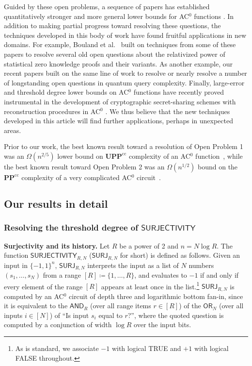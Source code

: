 \documentclass[11pt]{article}
\numberwithin{equation}{section}
\theoremstyle{definition}
\theoremstyle{plain}
\newcommand{\SURJ}{\mathsf{ SURJ}}
\newcommand{\OR}{\mathsf{ OR}}
\newcommand{\bits}{\{-1,1\}}
\newcommand{\PP}{\mathbf{PP}}
\newcommand{\UPP}{\mathbf{UPP}}
\newcommand{\AND}{\mathsf{AND}}
\begin{document}
Guided by these open problems, a sequence
of %
papers  %
has established quantitatively stronger and more general lower bounds for AC$^0$ functions \cite{bt13, bt14, sherstov14, sherstov15, dlweight, bt16, adegsurj}.
In addition to making partial progress toward resolving these questions, the techniques developed in %
this body of work  %
have found fruitful applications in new domains.
For example, Bouland et al.~\cite{bchtv} built on techniques from
%
some of these papers  %
\cite{bt13, bt14, sherstov14, bt16} to resolve several 
old open questions about the relativized power of statistical zero knowledge proofs and their variants.
%
As another example, our recent 
%
papers
\cite{adegsurj, bkt} built on the same line of work to
resolve or nearly resolve a number of longstanding open questions in quantum query complexity.
Finally, large-error and threshold degree lower bounds on AC$^0$ functions
have recently proved instrumental in the development of cryptographic secret-sharing
schemes with reconstruction procedures in AC$^0$ \cite{viola, bogicalp, cheng2017near}. We thus believe that the new techniques developed in this
%
article  %
will find %
further applications, perhaps in unexpected areas.


Prior to our work, the best known result toward a resolution of Open Problem 1 was an $\Omega(n^{2/5})$ lower
bound on $\UPP^{\text{cc}}$ complexity of an AC$^0$ function~\cite{bt16}, while 
the best known result toward Open Problem 2
was an $\Omega(n^{1/2})$ 
bound on the $\PP^{\text{cc}}$ complexity of a very complicated AC$^0$ circuit~\cite{sherstov15}. \label{sec:previoussec}

\label{s:openquestion1}

\subsection{Our results in detail}


\subsubsection{Resolving the threshold degree of
  \texorpdfstring{$\mathsf{SURJECTIVITY}$}{SURJECTIVITY}}
\label{surjoverview}
\noindent \textbf{Surjectivity and its history.} Let $R$ be a power of 2 and $n=N \log R$. The function $\mathsf{SURJECTIVITY}_{R, N}$ %
($\SURJ_{R, N}$ for short) is defined as follows. Given an input in $\bits^n$, $\SURJ_{R, N}$ interprets the input as a list of $N$ numbers $(s_1, \dots, s_N)$
from a range $[R]\coloneqq \{1, \dots, R\}$, and %
evaluates to $-1$ if and only if every element of the range $[R]$ appears at least once in the list.\footnote{As is standard, we associate $-1$ with logical TRUE and $+1$ with logical FALSE throughout.} $\SURJ_{R, N}$ is computed by an AC$^0$ circuit
of depth three and logarithmic bottom fan-in, since it is equivalent to the $\AND_R$ (over all range items $r \in [R]$) of the $\OR_N$ (over all inputs $i \in [N]$) of ``Is input $s_i$ equal to $r$?'', where the quoted question is computed by a conjunction of width $\log R$ over the input bits.
\end{document}
